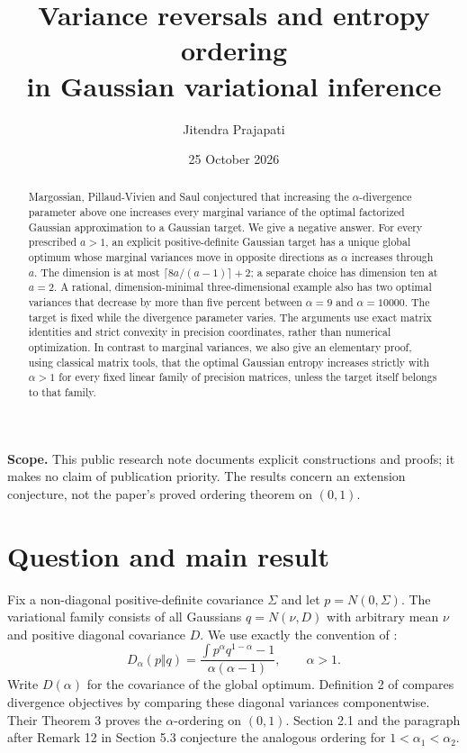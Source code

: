 \documentclass[11pt]{article}
\title{Variance reversals and entropy ordering\\in Gaussian variational inference}
\author{Jitendra Prajapati}
\date{25 October 2026}
\theoremstyle{remark}\newtheorem{remark}[theorem]{Remark}
\begin{document}
\maketitle
\begin{abstract}
Margossian, Pillaud-Vivien and Saul conjectured that increasing the
$\alpha$-divergence parameter above one increases every marginal variance
of the optimal factorized Gaussian approximation to a Gaussian target.
We give a negative answer. For every prescribed $a>1$, an explicit
positive-definite Gaussian target has a unique global optimum whose
marginal variances move in opposite directions as $\alpha$ increases
through $a$. The dimension is at most
$\lceil 8a/(a-1)\rceil+2$; a separate choice has dimension ten at $a=2$.
A rational, dimension-minimal three-dimensional example also has two optimal variances
that decrease by more than five percent between $\alpha=9$ and
$\alpha=10000$. The target is fixed while the divergence parameter
varies. The arguments use exact matrix identities and strict convexity
in precision coordinates, rather than numerical optimization. In contrast to marginal variances,
we also give an elementary proof, using classical matrix tools, that
the optimal Gaussian entropy increases strictly with
$\alpha>1$ for every fixed linear family of precision matrices,
unless the target itself belongs to that family.
\end{abstract}
\noindent\textbf{Scope.} This public research note documents explicit constructions
and proofs; it makes no claim of publication priority. The results concern
an extension conjecture, not the paper's proved ordering theorem on $(0,1)$.

\section{Question and main result}
Fix a non-diagonal positive-definite covariance $\Sigma$ and let
$p=N(0,\Sigma)$. The variational family consists of all Gaussians
$q=N(\nu,D)$ with arbitrary mean $\nu$ and positive diagonal covariance $D$.
We use exactly the convention of \cite{mps}:
\begin{equation}\label{eq:div}
 D_\alpha(p\Vert q)
 =\frac{\int p^\alpha q^{1-\alpha}-1}{\alpha(\alpha-1)},
 \qquad \alpha>1.
\end{equation}
Write $D(\alpha)$ for the covariance of the global optimum.
Definition 2 of \cite{mps} compares divergence objectives by comparing
these diagonal variances componentwise. Their Theorem 3 proves the
$\alpha$-ordering on $(0,1)$. Section 2.1 and the paragraph after
Remark 12 in Section 5.3 conjecture the analogous ordering for
$1<\alpha_1<\alpha_2$.
\end{document}
